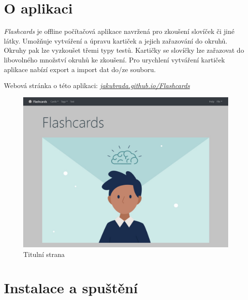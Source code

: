 \documentclass[11pt]{article}
\begin{document}

\clearpage
\tableofcontents
\clearpage
\hypertarget{o-aplikaci}{%
\section{O aplikaci}\label{o-aplikaci}}

\emph{Flashcards} je offline počítačová aplikace navržená pro zkoušení
slovíček či jiné látky. Umožňuje vytváření a úpravu kartiček a jejich
zařazování do okruhů. Okruhy pak lze vyzkoušet třemi typy testů.
Kartičky se slovíčky lze zařazovat do libovolného množství okruhů ke
zkoušení. Pro urychlení vytváření kartiček aplikace nabízí export a
import dat do/ze souboru.

Webová stránka o této aplikaci:
\href{https://jakubrada.github.io/Flashcards/}{\emph{jakubrada.github.io/Flashcards}}

\begin{figure}
\centering
\includegraphics{../../../../assets/title_page.jpg}
\caption{Titulní strana}
\end{figure}

\hypertarget{instalace-a-spuux161tux11bnuxed}{%
\section{Instalace a spuštění}\label{instalace-a-spuux161tux11bnuxed}}
\end{document}
